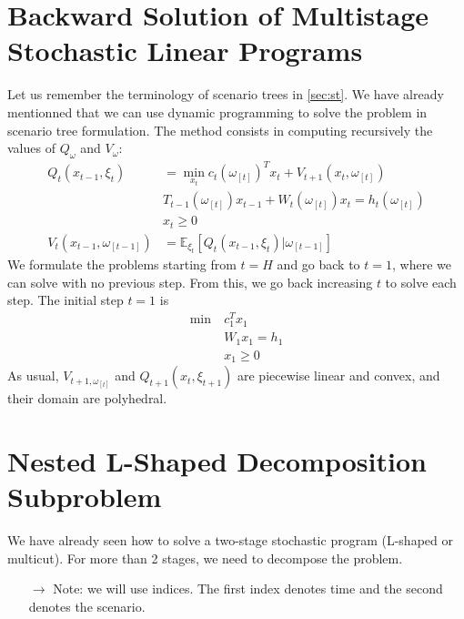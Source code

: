 \documentclass[12pt, openany]{report}
\newcommand{\E}{\mathbb{E}}
\theoremstyle{definition}
\begin{document}
\section{Backward Solution of Multistage Stochastic Linear Programs}
Let us remember the terminology of scenario trees in \ref{sec:st}. We have already mentionned that we can use dynamic programming to solve the problem in scenario tree formulation. The method consists in computing recursively the values of $Q_\omega$ and $V_\omega$:\\
\begin{equation}
	\begin{aligned}
		Q_t(x_{t-1},\xi_t) &= \min_{x_t} c_t(\omega_{[t]})^T x_t + V_{t+1} (x_t, \omega_{[t]})\\
		& T_{t-1}(\omega_{[t]})x_{t-1} + W_t(\omega_{[t]})x_t = h_t(\omega_{[t]})\\
		& x_t\ge 0\\
		V_t(x_{t-1}, \omega_{[t-1]}) &= \E_{\xi_t} [Q_t(x_{t-1}, \xi_t)|\omega_{[t-1]}]
	\end{aligned}
\end{equation}
We formulate the problems starting from $t=H$ and go back to $t=1$, where we can solve with no previous step. From this, we go back increasing $t$ to solve each step. The initial step $t=1$ is 
\begin{equation}
	\begin{aligned}
		\min \ & c_1^Tx_1 \\
		&W_1x_1=h_1\\
		&x_1\ge 0
	\end{aligned}
\end{equation}
As usual, $V_{t+1, \omega_{[t]}}$ and $Q_{t+1}(x_t, \xi_{t+1})$ are piecewise linear and convex, and their domain are polyhedral. 
\section{Nested L-Shaped Decomposition Subproblem}
We have already seen how to solve a two-stage stochastic program (L-shaped or multicut). For more than 2 stages, we need to decompose the problem. 
\begin{itemize}
	\item [$\to$] Note: we will use indices. The first index denotes time and the second denotes the scenario.
\end{itemize}
\end{document}
